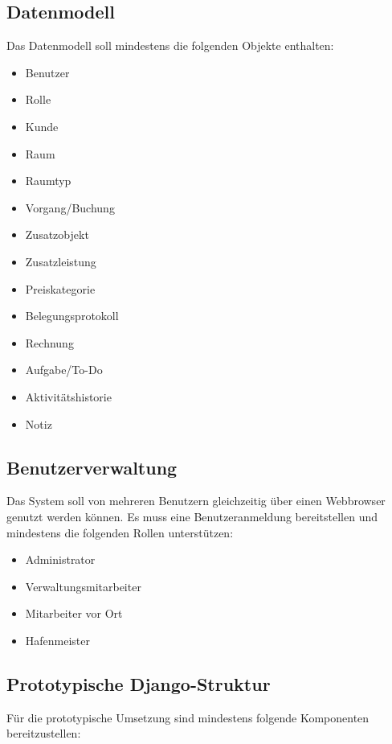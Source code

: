 \subsection{Datenmodell}

Das Datenmodell soll mindestens die folgenden Objekte enthalten:

\begin{itemize}
\item Benutzer
\item Rolle
\item Kunde
\item Raum
\item Raumtyp
\item Vorgang/Buchung
\item Zusatzobjekt
\item Zusatzleistung
\item Preiskategorie
\item Belegungsprotokoll
\item Rechnung
\item Aufgabe/To-Do
\item Aktivitätshistorie
\item Notiz
\end{itemize}

\subsection{Benutzerverwaltung}

Das System soll von mehreren Benutzern gleichzeitig über einen Webbrowser genutzt werden können. Es muss eine Benutzeranmeldung bereitstellen und mindestens die folgenden Rollen unterstützen:

\begin{itemize}
\item Administrator
\item Verwaltungsmitarbeiter
\item Mitarbeiter vor Ort
\item Hafenmeister
\end{itemize}

\subsection{Prototypische Django-Struktur}

Für die prototypische Umsetzung sind mindestens folgende Komponenten bereitzustellen:

